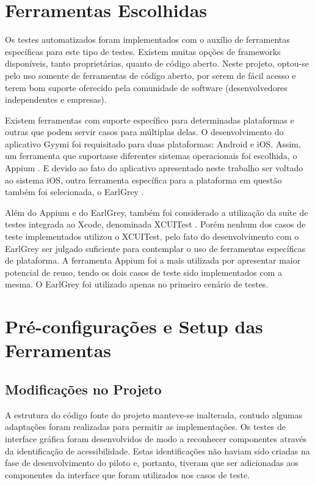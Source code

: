 \section{Ferramentas Escolhidas}
Os testes automatizados foram implementados com o auxílio de ferramentas específicas para este tipo de testes. Existem muitas opções de frameworks disponíveis, tanto proprietárias, quanto de código aberto. Neste projeto, optou-se pelo uso somente de ferramentas de código aberto, por serem de fácil acesso e terem bom suporte oferecido pela comunidade de software (desenvolvedores independentes e empresas).

Existem ferramentas com suporte específico para determinadas plataformas e outras que podem servir casos para múltiplas delas. O desenvolvimento do aplicativo Gyymi foi requisitado para duas plataformas: Android e iOS. Assim, um ferramenta que suportasse diferentes sistemas operacionais foi escolhida, o Appium \cite{appium}. E devido ao fato do aplicativo apresentado neste trabalho ser voltado ao sistema iOS, outra ferramenta específica para a plataforma em questão também foi selecionada, o EarlGrey \cite{earlgrey}.

Além do Appium e do EarlGrey, também foi considerado a utilização da suíte de testes integrada ao Xcode, denominada XCUITest \cite{xcuitest}. Porém nenhum dos casos de teste implementados utilizou o XCUITest, pelo fato do desenvolvimento com o EarlGrey ser julgado suficiente para contemplar o uso de ferramentas específicas de plataforma. A ferramenta Appium foi a mais utilizada por apresentar maior potencial de reuso, tendo os dois casos de teste sido implementados com a mesma. O EarlGrey foi utilizado apenas no primeiro cenário de testes.

\section{Pré-configurações e Setup das Ferramentas}

\subsection{Modificações no Projeto}
A estrutura do código fonte do projeto manteve-se inalterada, contudo algumas adaptações foram realizadas para permitir as implementações. Os testes de interface gráfica foram desenvolvidos de modo a reconhecer componentes através da identificação de acessibilidade. Estas identificações não haviam sido criadas na fase de desenvolvimento do piloto e, portanto, tiveram que ser adicionadas aos componentes da interface que foram utilizados nos casos de teste.

